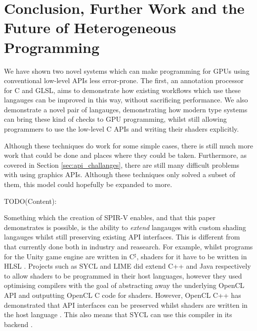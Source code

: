 \documentclass[a4paper,12pt,twoside,openright]{report}
\begin{document}



\chapter{Conclusion, Further Work and the Future of Heterogeneous Programming}



We have shown two novel systems which can make programming for GPUs using
conventional low-level APIs less error-prone. The first, an annotation
processor for C and GLSL, aims to demonstrate how existing workflows which use
these langauges can be improved in this way, without sacrificing performance.
We also demonstrate a novel pair of langauges, demonstrating how modern type
systems can bring these kind of checks to GPU programming, whilst still
allowing programmers to use the low-level C APIs and writing their shaders
explicitly.

Although these techniques do work for some simple cases, there is still much
more work that could be done and places where they could be taken. Furthermore,
as covered in Section \ref{sec:api_challanges}, there are still many difficult
problems with using graphics APIs. Although these techniques only solved a
subset of them, this model could hopefully be expanded to more.

TODO(Content):


Something which the creation of SPIR-V enables, and that this paper
demonstrates is possible, is the ability to \textit{extend} langauges with
custom shading langauges whilst still preserving existing API interfaces. This
is different from that currently done both in industry and reasearch. For
example, whilst programs for the Unity game engine are written in C$^\sharp$,
shaders for it have to be written in HLSL \cite{TODO}. Projects such as SYCL
and LIME did extend C++ and Java respectively to allow shaders to be programmed
in their host languages, however they used optimising compilers with the goal
of abstracting away the underlying OpenCL API and outputting OpenCL C code for
shaders. However, OpenCL C++ has demonstrated that API interfaces can be
preserved whilst shaders are written in the host language
\cite{OpenCLCPPWhitePaper}. This also means that SYCL can use this compiler in
its backend \cite{TODO}.
\end{document}
